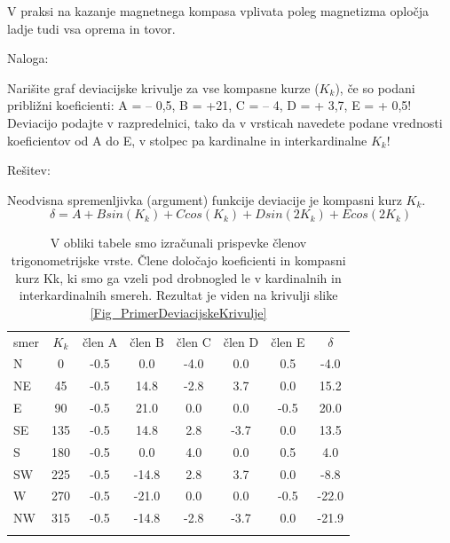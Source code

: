V praksi na kazanje magnetnega kompasa vplivata poleg magnetizma opločja ladje tudi vsa oprema in tovor. 


Naloga:

Narišite graf deviacijske krivulje za vse kompasne kurze ($K_k$), če so podani približni koeficienti: A = – 0,5\degree, B = +21\degree, C = – 4\degree, D = + 3,7\degree, E = + 0,5\degree! Deviacijo podajte v razpredelnici, tako da v vrsticah navedete podane vrednosti koeficientov od A do E, v stolpec pa kardinalne in interkardinalne $K_k$!

Rešitev:

Neodvisna spremenljivka (argument) funkcije deviacije je kompasni kurz $K_k$. 
$$
\delta = A + B sin(K_k) + C cos(K_k) + D sin(2 K_k) + E cos(2 K_k)
$$


%
\begin{table}
	\centering
	\caption{V obliki tabele smo izračunali prispevke členov trigonometrijske vrste. Člene določajo koeficienti in kompasni kurz Kk, ki smo ga vzeli pod drobnogled le v kardinalnih in interkardinalnih smereh. Rezultat je viden na krivulji slike \ref{Fig_PrimerDeviacijskeKrivulje}}
	\label{TabMagDev}       %
	\begin{tabular}{lccccccc}
		\hline\noalign{\smallskip}
		smer & $K_k$  & člen A & člen B & člen C & člen D & člen E & $\delta$ \\
		N & 0\degree & -0.5\degree & 0.0\degree & -4.0\degree & 0.0\degree & 0.5\degree & -4.0\degree \\
		NE & 45\degree & -0.5\degree & 14.8\degree & -2.8\degree & 3.7\degree & 0.0\degree & 15.2\degree \\
		E & 90\degree & -0.5\degree & 21.0\degree & 0.0\degree & 0.0\degree & -0.5\degree & 20.0\degree \\
		SE & 135\degree & -0.5\degree & 14.8\degree & 2.8\degree & -3.7\degree & 0.0\degree & 13.5\degree \\
		S & 180\degree & -0.5\degree & 0.0\degree & 4.0\degree & 0.0\degree & 0.5\degree & 4.0\degree \\
		SW & 225\degree & -0.5\degree & -14.8\degree & 2.8\degree & 3.7\degree & 0.0\degree & -8.8\degree \\
		W & 270\degree & -0.5\degree & -21.0\degree & 0.0\degree & 0.0\degree & -0.5\degree & -22.0\degree \\
		NW & 315\degree & -0.5\degree & -14.8\degree & -2.8\degree & -3.7\degree & 0.0\degree & -21.9\degree \\		
		\noalign{\smallskip}\hline
	\end{tabular}
\end{table}



